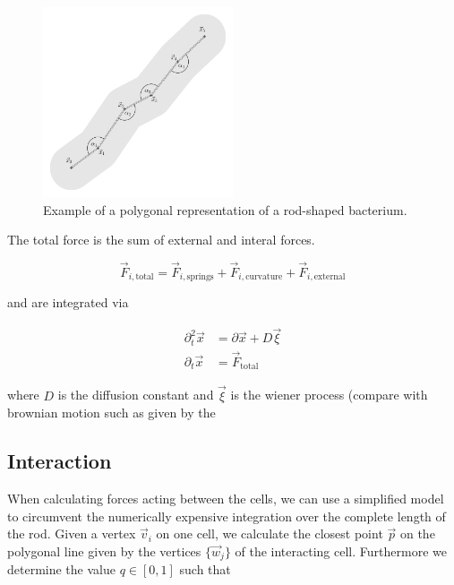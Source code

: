 \documentclass{article}
\begin{document}
\begin{figure}
    \centering
    \includegraphics[width=0.5\textwidth]
        {../docs/source/_static/mechanics.png}
    \caption{Example of a polygonal representation of a rod-shaped bacterium.}
    \label{fig:mechanics-bacterium}
\end{figure}

The total force is the sum of external and interal forces.

\begin{equation}
    \vec{F}_{i,\text{total}} = \vec{F}_{i,\text{springs}}+ \vec{F}_{i,\text{curvature}} + \vec{F}_{i,\text{external}}
   \label{force-total}
\end{equation}

and are integrated via

\begin{align}
    \partial_t^2 \vec{x} &= \partial\vec{x} + D\vec{\xi}\\
    \partial_t\vec{x} &= \vec{F}_\text{total}
    \label{equations-of-motion}
\end{align}

where $D$ is the diffusion constant and  $\vec{\xi}$ is the wiener process (compare with
brownian motion such as given by the

\subsection{Interaction}

When calculating forces acting between the cells, we can use a simplified model to circumvent the
numerically expensive integration over the complete length of the rod.
Given a vertex $\vec{v}_i$ on one cell, we calculate the closest point $\vec{p}$ on the polygonal
line given by the vertices $\{\vec{w}_j\}$ of the interacting cell.
Furthermore we determine the value $q\in[0,1]$ such that
\end{document}
